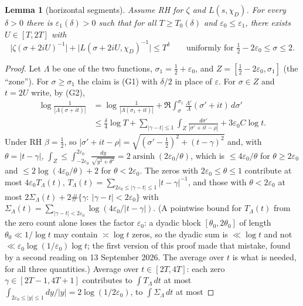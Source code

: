 \documentclass[11pt,a4paper]{article}
\newtheorem{lemma}[theorem]{Lemma}
\theoremstyle{remark}\newtheorem{remark}[theorem]{Remark}
\begin{document}
\begin{lemma}[horizontal segments]\label{lem:horizontal}
Assume RH for $\zeta$ and $L(s,\chi_D)$. For every $\delta>0$ there is $\varepsilon_1(\delta)>0$ such that
for all $T\ge T_0(\delta)$ and $\varepsilon_0\le\varepsilon_1$, there exists $U\in[T,2T]$ with
\[
\bigl|\zeta(\sigma+2iU)^{-1}\bigr|+\bigl|L(\sigma+2iU,\chi_D)^{-1}\bigr|\le T^{\delta}\qquad\text{uniformly for }\tfrac12-2\varepsilon_0\le\sigma\le2 .
\]
\end{lemma}
\begin{proof}
Let $\Lambda$ be one of the two functions, $\sigma_1=\tfrac12+\varepsilon_0$, and $Z=[\tfrac12-2\varepsilon_0,\sigma_1]$
(the ``zone''). For $\sigma\ge\sigma_1$ the claim is (G1) with $\delta/2$ in place of $\varepsilon$. For $\sigma\in Z$ and
$t=2U$ write, by (G2),
\[
\begin{aligned}
\log\frac1{|\Lambda(\sigma+it)|}&=\log\frac1{|\Lambda(\sigma_1+it)|}+\Re\int_\sigma^{\sigma_1}\frac{\Lambda'}{\Lambda}(\sigma'+it)\,d\sigma'\\
&\le\frac{\delta}4\log T+\sum_{|\gamma-t|\le1}\int_{Z}\frac{d\sigma'}{|\sigma'+it-\rho|}+3\varepsilon_0C\log t .
\end{aligned}
\]
Under RH $\beta=\tfrac12$, so $|\sigma'+it-\rho|=\sqrt{(\sigma'-\tfrac12)^2+(t-\gamma)^2}$ and, with
$\theta=|t-\gamma|$, $\int_Z\le\int_{-2\varepsilon_0}^{2\varepsilon_0}\frac{dy}{\sqrt{y^2+\theta^2}}=2\operatorname{arsinh}(2\varepsilon_0/\theta)$,
which is $\le4\varepsilon_0/\theta$ for $\theta\ge2\varepsilon_0$ and $\le2\log(4\varepsilon_0/\theta)+2$ for $\theta<2\varepsilon_0$.
The zeros with $2\varepsilon_0\le\theta\le1$ contribute at most $4\varepsilon_0T_\Lambda(t)$, $T_\Lambda(t)=\sum_{2\varepsilon_0\le|\gamma-t|\le1}|t-\gamma|^{-1}$,
and those with $\theta<2\varepsilon_0$ at most $2\Sigma_\Lambda(t)+2\#\{\gamma:\ |\gamma-t|<2\varepsilon_0\}$ with
$\Sigma_\Lambda(t)=\sum_{|\gamma-t|<2\varepsilon_0}\log(4\varepsilon_0/|t-\gamma|)$. (A pointwise bound for $T_\Lambda(t)$ from the
zero count alone loses the factor $\varepsilon_0$: a dyadic block $[\theta_0,2\theta_0]$ of length $\theta_0\ll1/\log t$ may contain
$\asymp\log t$ zeros, so the dyadic sum is $\ll\log t$ and not $\ll\varepsilon_0\log(1/\varepsilon_0)\log t$; the first version of this proof
made that mistake, found by a second reading on 13 September 2026. The average over $t$ is what is needed, for all
three quantities.) Average over $t\in[2T,4T]$: each zero $\gamma\in[2T-1,4T+1]$ contributes to $\int T_\Lambda\,dt$ at most
$\int_{2\varepsilon_0\le|y|\le1}dy/|y|=2\log(1/2\varepsilon_0)$, to $\int\Sigma_\Lambda\,dt$ at most

\end{proof}
\end{document}
